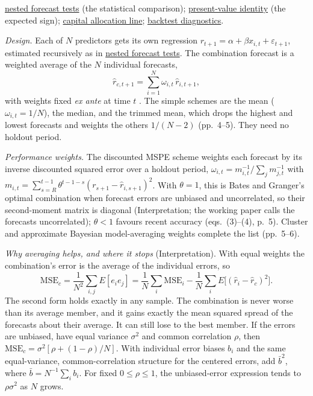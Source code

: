 \begin{qfmethod}
 \hyperref[meth:nested-forecast-tests]{nested forecast tests} (the statistical comparison); \hyperref[res:campbell-shiller-identity]{present-value identity} (the expected sign); \hyperref[meth:capital-allocation-line]{capital allocation line}; \hyperref[meth:backtest-evaluation-diagnostics]{backtest diagnostics}.

\end{qfmethod}

\begin{qfmethod}\label{meth:forecast-combination}
 \emph{Design.} Each of $N$ predictors gets its own regression $r_{t+1}=\alpha+\beta x_{i,t}+\varepsilon_{t+1}$, estimated recursively as in \hyperref[meth:nested-forecast-tests]{nested forecast tests}. The combination forecast is a weighted average of the $N$ individual forecasts,
\[ \hat r_{c,t+1}=\sum_{i=1}^{N}\omega_{i,t}\,\hat r_{i,t+1}, \]
with weights fixed \emph{ex ante} at time $t$ \citep[working paper, February 2008, eqs.~(1)--(2), pp.~3--4]{rapach-strauss-zhou-2008-wp}. The simple schemes are the mean ($\omega_{i,t}=1/N$), the median, and the trimmed mean, which drops the highest and lowest forecasts and weights the others $1/(N-2)$ (pp.~4--5). They need no holdout period.

\emph{Performance weights.} The discounted MSPE scheme weights each forecast by its inverse discounted squared error over a holdout period, $\omega_{i,t}=m_{i,t}^{-1}/\sum_j m_{j,t}^{-1}$ with $m_{i,t}=\sum_{s=R}^{t-1}\theta^{t-1-s}(r_{s+1}-\hat r_{i,s+1})^2$. With $\theta=1$, this is Bates and Granger's optimal combination when forecast errors are unbiased and uncorrelated, so their second-moment matrix is diagonal (Interpretation; the working paper calls the forecasts uncorrelated); $\theta<1$ favours recent accuracy (eqs.~(3)--(4), p.~5). Cluster and approximate Bayesian model-averaging weights complete the list (pp.~5--6).

\emph{Why averaging helps, and where it stops} (Interpretation). With equal weights the combination's error is the average of the individual errors, so
\[ \mathrm{MSE}_c=\frac1{N^2}\sum_{i,j}E[e_ie_j]=\frac1N\sum_i\mathrm{MSE}_i-\frac1N\sum_iE\bigl[(\hat r_i-\hat r_c)^2\bigr]. \]
The second form holds exactly in any sample. The combination is never worse than its average member, and it gains exactly the mean squared spread of the forecasts about their average. It can still lose to the best member. If the errors are unbiased, have equal variance $\sigma^2$ and common correlation $\rho$, then $\mathrm{MSE}_c=\sigma^2[\rho+(1-\rho)/N]$. With individual error biases $b_i$ and the same equal-variance, common-correlation structure for the centered errors, add $\bar b^2$, where $\bar b=N^{-1}\sum_i b_i$. For fixed $0\leq\rho\leq1$, the unbiased-error expression tends to $\rho\sigma^2$ as $N$ grows.


\end{qfmethod}
